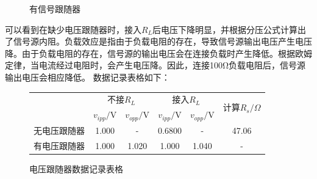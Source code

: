 \documentclass[a4paper,11pt,UTF8]{article}
\begin{document}
\begin{figure}[H]
	\centering
	\setcounter{subfigure}{0}
	
	\caption*{有信号跟随器}
\end{figure}
可以看到在缺少电压跟随器时，接入$R_L$后电压下降明显，并根据分压公式计算出了信号源内阻。负载效应是指由于负载电阻的存在，导致信号源输出电压产生电压降。由于负载电阻的存在，信号源的输出电压会在连接负载时产生降低。根据欧姆定律，当电流经过电阻时，会产生电压降。因此，连接100Ω负载电阻后，信号源输出电压会相应降低。
\newpage
数据记录表格如下：
\begin{figure}[H]
	\centering
	\caption*{电压跟随器数据记录表格}
	
	\begin{tabular}{|c|c|c|c|c|c|}
		\hline
		\multirow{2}{*}{}   & \multicolumn{2}{c|}{不接$R_L$} & \multicolumn{2}{c|}{接入$R_L$} &
		\multirow{2}{*}{计算$R_s/\Omega$}\\
		\cline{2-5}
		\multirow{2}{*}{} & $v_{ipp}/$V & $v_{opp}/$V & $v_{ipp}/$V & $v_{opp}/$V & \multirow{2}{*}{}\\
		\hline
		无电压跟随器 & 1.000 & - & 0.6800 & - & 47.06\\
		\hline
		有电压跟随器 & 1.000 & 1.020 & 1.000 & 1.040 & - \\
		\hline
	\end{tabular}
\end{figure} 
\end{document}
